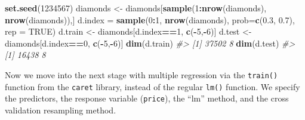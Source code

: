 \documentclass[]{book}
\newenvironment{Shaded}{\begin{snugshade}}{\end{snugshade}}
\newcommand{\CommentTok}[1]{\textcolor[rgb]{0.56,0.35,0.01}{\textit{#1}}}
\newcommand{\DataTypeTok}[1]{\textcolor[rgb]{0.13,0.29,0.53}{#1}}
\newcommand{\DecValTok}[1]{\textcolor[rgb]{0.00,0.00,0.81}{#1}}
\newcommand{\FloatTok}[1]{\textcolor[rgb]{0.00,0.00,0.81}{#1}}
\newcommand{\KeywordTok}[1]{\textcolor[rgb]{0.13,0.29,0.53}{\textbf{#1}}}
\newcommand{\NormalTok}[1]{#1}
\newcommand{\OperatorTok}[1]{\textcolor[rgb]{0.81,0.36,0.00}{\textbf{#1}}}
\newcommand{\OtherTok}[1]{\textcolor[rgb]{0.56,0.35,0.01}{#1}}
\newcommand{\StringTok}[1]{\textcolor[rgb]{0.31,0.60,0.02}{#1}}
\begin{document}
\begin{Shaded}
\begin{Highlighting}[]
\KeywordTok{set.seed}\NormalTok{(}\DecValTok{1234567}\NormalTok{)}
\NormalTok{diamonds <-}\StringTok{ }\NormalTok{diamonds[}\KeywordTok{sample}\NormalTok{(}\DecValTok{1}\OperatorTok{:}\KeywordTok{nrow}\NormalTok{(diamonds), }\KeywordTok{nrow}\NormalTok{(diamonds)),]}
\NormalTok{d.index =}\StringTok{ }\KeywordTok{sample}\NormalTok{(}\DecValTok{0}\OperatorTok{:}\DecValTok{1}\NormalTok{, }\KeywordTok{nrow}\NormalTok{(diamonds), }\DataTypeTok{prob=}\KeywordTok{c}\NormalTok{(}\FloatTok{0.3}\NormalTok{, }\FloatTok{0.7}\NormalTok{), }\DataTypeTok{rep =} \OtherTok{TRUE}\NormalTok{)}
\NormalTok{d.train <-}\StringTok{ }\NormalTok{diamonds[d.index}\OperatorTok{==}\DecValTok{1}\NormalTok{, }\KeywordTok{c}\NormalTok{(}\OperatorTok{-}\DecValTok{5}\NormalTok{,}\OperatorTok{-}\DecValTok{6}\NormalTok{)]}
\NormalTok{d.test <-}\StringTok{ }\NormalTok{diamonds[d.index}\OperatorTok{==}\DecValTok{0}\NormalTok{, }\KeywordTok{c}\NormalTok{(}\OperatorTok{-}\DecValTok{5}\NormalTok{,}\OperatorTok{-}\DecValTok{6}\NormalTok{)]}
\KeywordTok{dim}\NormalTok{(d.train)}
\CommentTok{#> [1] 37502     8}
\KeywordTok{dim}\NormalTok{(d.test)}
\CommentTok{#> [1] 16438     8}
\end{Highlighting}
\end{Shaded}

Now we move into the next stage with multiple regression via the \texttt{train()} function from the \texttt{caret} library, instead of the regular \texttt{lm()} function. We specify the predictors, the response variable (\texttt{price}), the ``lm'' method, and the cross validation resampling method.
\end{document}

